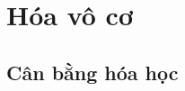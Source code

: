 \documentclass[Main.tex]{subfiles}
\begin{document}
	\part{Hóa vô cơ}
	\chapter{Cân bằng hóa học}
	\tatloigiai
	
	
\end{document}
